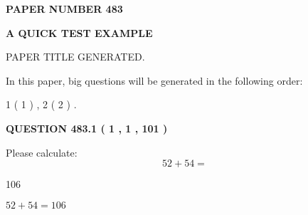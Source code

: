 \documentclass[12pt]{article}
\begin{document}
   
   
   
\newpage 
\setcounter{page}{ 
   483001 } 
   
   
   
   
 {\textbf{ \Large{ PAPER NUMBER  483  }}}
   
   
\vspace{0.2in}
   
   
   
   
   
   
   
   
 \vspace{0.2in}
{\LARGE {\textbf{ A QUICK TEST EXAMPLE}}}
   
   
 PAPER TITLE GENERATED.
   
   
   
\vspace{0.2in}
   
In this paper, big questions will be generated in the following order: 
   
   
   1 ( 1 )
 ,
   2 ( 2 )
 .
  
\vspace{0.2in}
  
{\textbf{\Large{QUESTION
483.1 
 ( 1 , 1 , 101 )
}}}
  
  
 
Please calculate:
\begin{equation}
52 +  %
54 = \nonumber
\end{equation}
 
 
 
\noindent{}
 
 

106
 
 
\noindent{}
 
 

 
 
 
\noindent{}
 
 

$ %
52 +  %
54=   %
106$
 
 
\noindent{}
 
 

 
   
\end{document}
